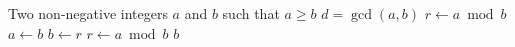 \documentclass{article}
\begin{document}
\begin{algorithm}
\caption{Euclid's Algorithm}
\label{euclid}
\begin{algorithmic}[1]
\Require Two non-negative integers $a$ and $b$ such that $a \geq b$
\Ensure $d = \gcd(a,b)$
\State $r \gets a \bmod b$
\State $a \gets b$
\State $b \gets r$
\State $r \gets a \bmod b$
\EndWhile
\State \Return $b$
\end{algorithmic}
\end{algorithm}
\end{document}
